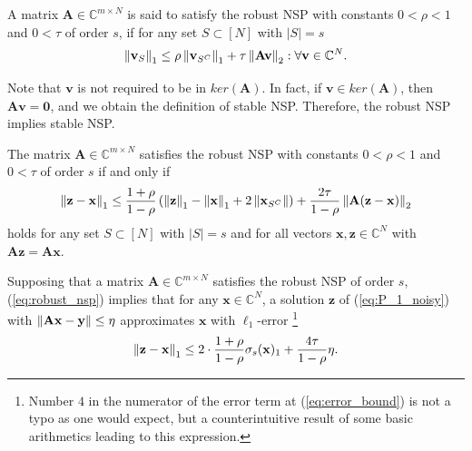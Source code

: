 \begin{definition}
A matrix $\mathbf{A} \in \mathbb{C}^{m \times N}$ is said to satisfy the robust NSP with constants $0 < \rho < 1$ and $0 < \tau$ of order $s$, if for any set $S \subset [N]$ with $|S| = s$
\[\left\lVert\mathbf{v}_S\right\rVert_1 \le \rho \left\lVert\mathbf{v}_{S^C}\right\rVert_1 + \tau \left\lVert\mathbf{Av}\right\rVert_2 : \forall \mathbf{v} \in \mathbb{C}^N.\]
\end{definition}

\begin{remark}
Note that $\mathbf{v}$ is not required to be in $ker(\mathbf{A})$.  In fact, if $\mathbf{v} \in ker(\mathbf{A})$, then $\mathbf{Av} = \mathbf{0}$, and we obtain the definition of stable NSP. Therefore, the robust NSP implies stable NSP.
\end{remark}

\begin{theorem}
The matrix $\mathbf{A} \in \mathbb{C}^{m \times N}$ satisfies the robust NSP with constants $0 < \rho < 1$ and $0 < \tau$ of order $s$ if and only if
\begin{equation}\label{eq:robust_nsp}
    \left\lVert\mathbf{z} - \mathbf{x}\right\rVert_1 \le \frac{1 + \rho}{1 - \rho} \left(\left\lVert\mathbf{z}\right\rVert_1 - \left\lVert\mathbf{x}\right\rVert_1 + 2\left\lVert\mathbf{x}_{S^C}\right\rVert\right) + \frac{2\tau}{1-\rho}\left\lVert\mathbf{A(z-x)}\right\rVert_2
\end{equation}
holds for any set $S \subset [N]$ with $|S| = s$ and for all vectors $\mathbf{x,z} \in \mathbb{C}^N$ with $\mathbf{Az} = \mathbf{Ax}$.
\end{theorem}

\begin{remark}
Supposing that a matrix $\mathbf{A} \in \mathbb{C}^{m \times N}$ satisfies the robust NSP of order $s$, (\ref{eq:robust_nsp}) implies that for any $\mathbf{x} \in \mathbb{C}^N$, a solution $\mathbf{z}$ of (\ref{eq:P_1_noisy}) with $\left\lVert\mathbf{Ax - y}\right\rVert \le \eta$ approximates $\mathbf{x}$ with $\ell_1$-error \footnote{Number $4$ in the numerator of the error term at (\ref{eq:error_bound}) is not a typo as one would expect, but a counterintuitive result of some basic arithmetics leading to this expression.}
\begin{equation}\label{eq:error_bound}
    \left\lVert\mathbf{z} - \mathbf{x}\right\rVert_1 \le 2 \cdot \frac{1 + \rho}{1 - \rho}\sigma_s(\mathbf{x})_1 + \frac{4\tau}{1-\rho}\eta.
\end{equation}
\end{remark}


\iffalse

